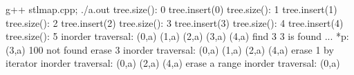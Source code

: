 {\footnotesize \begin{console} g++ stlmap.cpp; ./a.out
tree.size(): 0
tree.insert(0)
tree.size(): 1
tree.insert(1)
tree.size(): 2
tree.insert(2)
tree.size(): 3
tree.insert(3)
tree.size(): 4
tree.insert(4)
tree.size(): 5
inorder traversal: (0,a) (1,a) (2,a) (3,a) (4,a) 
find 3
3 is found ... *p: (3,a)
100 not found
erase 3
inorder traversal: (0,a) (1,a) (2,a) (4,a) 
erase 1 by iterator
inorder traversal: (0,a) (2,a) (4,a) 
erase a range
inorder traversal: (0,a)
\end{console}
}
